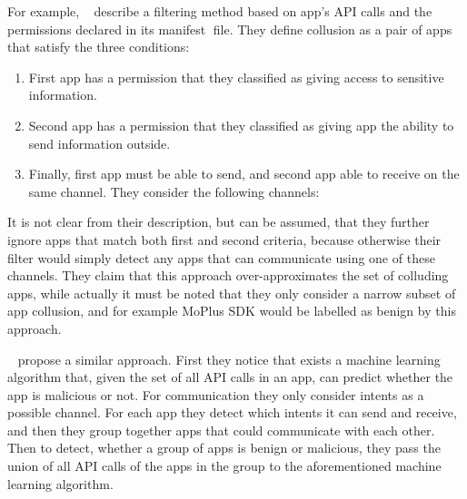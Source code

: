 \documentclass[article, oneside]{aaltoseries}
\begin{document}
For example, \citeauthor{Asavoae2016}~\cite{Asavoae2016} describe a filtering method based on app's API calls and the permissions declared in its manifest file. They define collusion as a pair of apps that satisfy the three conditions:
\begin{enumerate}
	\item First app has a permission that they classified as giving access to sensitive information.
	\item Second app has a permission that they classified as giving app the ability to send information outside.
	\item Finally, first app must be able to send, and second app able to receive on the same channel. They consider the following channels:
\end{enumerate}
It is not clear from their description, but can be assumed, that they further ignore apps that match both first and second criteria, because otherwise their filter would simply detect any apps that can communicate using one of these channels. They claim that this approach over-approximates the set of colluding apps, while actually it must be noted that they only consider a narrow subset of app collusion, and for example MoPlus SDK would be labelled as benign by this approach.

\citeauthor{Chen2018}~\cite{Chen2018} propose a similar approach. First they notice that exists a machine learning algorithm that, given the set of all API calls in an app, can predict whether the app is malicious or not. For communication they only consider intents as a possible channel. For each app they detect which intents it can send and receive, and then they group together apps that could communicate with each other. Then to detect, whether a group of apps is benign or malicious, they pass the union of all API calls of the apps in the group to the aforementioned machine learning algorithm.
\end{document}
